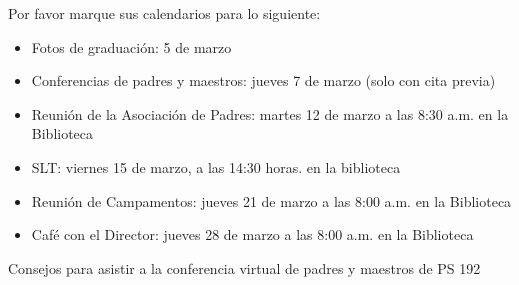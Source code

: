 \documentclass[12pt,letterpaper]{article}
\begin{document}
Por favor marque sus calendarios para lo siguiente:
\begin{itemize}
\item Fotos de graduación: 5 de marzo
\item Conferencias de padres y maestros: jueves 7 de marzo (solo con cita previa)
\item Reunión de la Asociación de Padres: martes 12 de marzo a las 8:30 a.m. en la Biblioteca
\item SLT: viernes 15 de marzo, a las 14:30 horas. en la biblioteca
\item Reunión de Campamentos: jueves 21 de marzo a las 8:00 a.m. en la Biblioteca
\item Café con el Director: jueves 28 de marzo a las 8:00 a.m. en la Biblioteca
\end{itemize}
Consejos para asistir a la conferencia virtual de padres y maestros de PS 192
\end{document}
